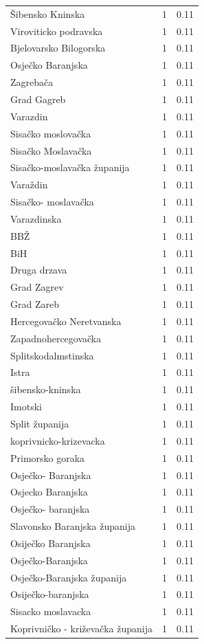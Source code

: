 \begin{tabular}{lrr}
Šibensko Kninska & 1 & 0.11 \\
Viroviticko podravska & 1 & 0.11 \\
Bjelovarsko Bilogorska & 1 & 0.11 \\
Osječko Baranjska & 1 & 0.11 \\
Zagrebača & 1 & 0.11 \\
Grad Gagreb & 1 & 0.11 \\
Varazdin & 1 & 0.11 \\
Sisačko moslovačka & 1 & 0.11 \\
Sisačko Moslavačka & 1 & 0.11 \\
Sisačko-moslavačka županija & 1 & 0.11 \\
Varaždin & 1 & 0.11 \\
Sisačko- moslavačka & 1 & 0.11 \\
Varazdinska & 1 & 0.11 \\
BBŽ & 1 & 0.11 \\
BiH & 1 & 0.11 \\
Druga drzava & 1 & 0.11 \\
Grad Zagrev & 1 & 0.11 \\
Grad Zareb & 1 & 0.11 \\
Hercegovačko Neretvanska & 1 & 0.11 \\
Zapadnohercegovačka & 1 & 0.11 \\
Splitskodalmstinska & 1 & 0.11 \\
Istra & 1 & 0.11 \\
šibensko-kninska & 1 & 0.11 \\
Imotski & 1 & 0.11 \\
Split županija & 1 & 0.11 \\
koprivnicko-krizevacka & 1 & 0.11 \\
Primorsko goraka & 1 & 0.11 \\
Osječko- Baranjska & 1 & 0.11 \\
Osjecko Baranjska & 1 & 0.11 \\
Osječko- baranjska & 1 & 0.11 \\
Slavonsko Baranjska županija & 1 & 0.11 \\
Osiječko Baranjska & 1 & 0.11 \\
Osječko-Baranjska & 1 & 0.11 \\
Osječko-Baranjska županija & 1 & 0.11 \\
Osiječko-baranjska & 1 & 0.11 \\
Sisacko moslavacka & 1 & 0.11 \\
Koprivničko - križevačka županija & 1 & 0.11 \\

\end{tabular}
